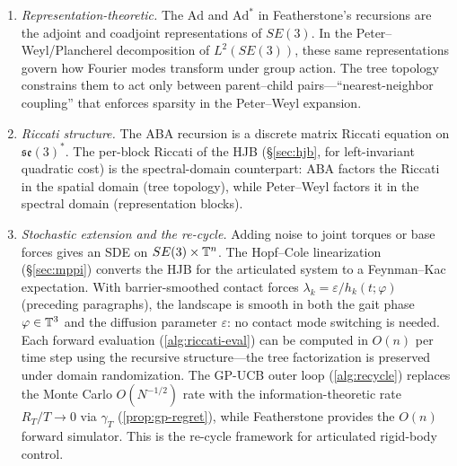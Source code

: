 \begin{enumerate}[label=(\roman*)]
\item \emph{Representation-theoretic.}
The $\mathrm{Ad}$ and $\mathrm{Ad}^*$ in Featherstone's recursions are the
adjoint and coadjoint representations of $SE(3)$.
In the Peter--Weyl/Plancherel decomposition of $L^2(SE(3))$, these same
representations govern how Fourier modes transform under group action.
The tree topology constrains them to act only between parent--child
pairs---``nearest-neighbor coupling'' that enforces sparsity in the
Peter--Weyl expansion.

\item \emph{Riccati structure.}
The ABA recursion is a discrete matrix Riccati equation on
$\mathfrak{se}(3)^*$.
The per-block Riccati of the HJB (\S\ref{sec:hjb}, for left-invariant quadratic cost)
is the spectral-domain counterpart: ABA factors the Riccati in the spatial
domain (tree topology), while Peter--Weyl factors it in the spectral domain
(representation blocks).

\item \emph{Stochastic extension and the re-cycle.}
Adding noise to joint torques or base forces gives an SDE on
$SE(3) \times \mathbb{T}^n$.
The Hopf--Cole linearization (\S\ref{sec:mppi}) converts the HJB for the
articulated system to a Feynman--Kac expectation.
With barrier-smoothed contact forces
$\lambda_k = \varepsilon/h_k(t;\varphi)$ (preceding paragraphs),
the landscape is smooth in both the gait phase
$\varphi \in \mathbb{T}^3$ and the diffusion parameter $\varepsilon$:
no contact mode switching is needed.
Each forward evaluation (\cref{alg:riccati-eval}) can be computed in
$O(n)$ per time step using the recursive structure---the tree
factorization is preserved under domain randomization.
The GP-UCB outer loop (\cref{alg:recycle}) replaces the Monte Carlo
$O(N^{-1/2})$ rate with the information-theoretic rate $R_T/T \to 0$
via $\gamma_T$ (\cref{prop:gp-regret}), while Featherstone
provides the $O(n)$ forward simulator.
This is the re-cycle framework for articulated rigid-body control.
\end{enumerate}

